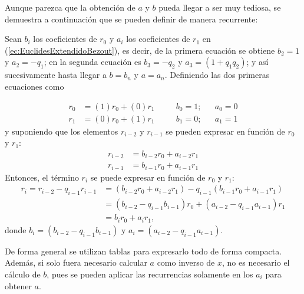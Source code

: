 \begin{obs}
    Aunque parezca que la obtención de $a$ y $b$ pueda llegar a ser muy tediosa, se demuestra a continuación que se pueden definir de manera recurrente:
    
        Sean $b_i$ los coeficientes de $r_0$  y $a_i$ los coeficientes de $r_1$ en (\ref{ec:EuclidesExtendidoBezout}), es decir, de la primera ecuación se obtiene $b_2 = 1$ y $a_2 = -q_1$; en la segunda ecuación es $b_3 = -q_2$ y $a_3 = (1+q_1q_2)$; y así sucesivamente hasta llegar a $b = b_n$ y $a = a_n$.
    Definiendo las dos primeras ecuaciones como
       
    \begin{equation}
        \begin{aligned}
            r_0 &= (1)r_0 + (0)r_1 \quad  && b_0 = 1; && a_0 = 0\\
            r_1 &= (0)r_0 + (1)r_1 \quad  && b_1 = 0; && a_1 = 1       
        \end{aligned}
        \tag{***}
        \label{inicializacion_coef_bezout}
    \end{equation}
        y suponiendo que los elementos $r_{i-2}$ y $r_{i-1}$ se pueden expresar en función de $r_0$ y $r_1$:
    \begin{align*}
        r_{i-2} &= b_{i-2}r_0 + a_{i-2}r_1  \\
        r_{i-1} &= b_{i-1}r_0 + a_{i-1}r_1  
    \end{align*}
        Entonces, el término $r_i$ se puede expresar en función de $r_0$ y $r_1$:
    \begin{align*}
        r_i = r_{i-2} - q_{i-1}r_{i-1} &= (b_{i-2}r_0 + a_{i-2}r_1) -q_{i-1}(b_{i-1}r_0 + a_{i-1}r_1)  \\
        &= (b_{i-2} -q_{i-1}b_{i-1})r_0 + (a_{i-2}-q_{i-1}a_{i-1})r_1\\
        &= b_i r_0 + a_i r_1,
    \end{align*}
    donde $b_i = (b_{i-2} -q_{i-1}b_{i-1})$ y $a_i = (a_{i-2}-q_{i-1}a_{i-1})$.
    
    \item De forma general se utilizan tablas para expresarlo todo de forma compacta. Además, si solo fuera necesario calcular $a$ como inverso de $x$, no es necesario el cálculo de $b$, pues se pueden aplicar las recurrencias solamente en los $a_i$ para obtener $a$.
\end{obs}

